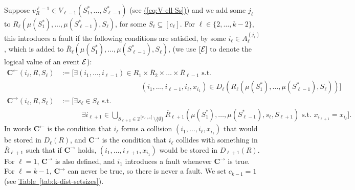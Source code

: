 \documentclass{theoretics}
\newcommand{\eq}[1]{\hyperref[eq:#1]{(\ref*{eq:#1})}}
\newcommand{\tabl}[1]{\hyperref[tab:#1]{Table~\ref*{tab:#1}}}
\renewcommand{\>}{\rangle}
\newcommand{\<}{\langle}
\renewcommand{\(}{\left(}
\renewcommand{\)}{\right)}
\begin{document}
Suppose $v_R^{\ell-1}\in V_{\ell-1}(S_1^*,\dots,S_{\ell-1}^*)$ (see \eq{V-ell-Ss}) and we add some $j_{\ell}$ to $R_{\ell}(\mu(S_1^*),\dots,\mu(S_{\ell-1}^*),S_{\ell})$, for some $S_{\ell}\subseteq [c_{\ell}]$. 
For $\ell\in\{2,\dots,k-2\}$, this introduces a fault if the following conditions are satisfied, by some $i_{\ell}\in A_{\ell}^{(j_{\ell})}$, which is added to $\overline{R}_{\ell}(\mu(S_1^*),\dots,\mu(S_{\ell-1}^*),S_{\ell})$, (we use $[{\cal E}]$ to denote the logical value of an event ${\cal E}$):
\begin{equation}
\begin{split}
\mathbf{C}^{\leftarrow}(i_{\ell},R,S_{\ell})&:= \big[\exists  (i_1,\dots,i_{\ell-1})\in R_1\times \overline{R}_2\times \dots \times \overline{R}_{\ell-1}\mbox{ s.t. }\\
& \qquad\qquad\qquad\qquad\qquad\quad\; (i_1,\dots,i_{\ell-1},i_{\ell},x_{i_1})\in D_{\ell}(R_{\ell}(\mu(S_1^*),\dots,\mu(S_{\ell-1}^*),S_{\ell}))\big]\\
\mathbf{C}^{\rightarrow}(i_{\ell},R,S_{\ell})&:= \Bigg[\exists s_{\ell}\in S_{\ell} \mbox{ s.t. }\\
&\qquad\quad\exists i_{\ell+1}\in \bigcup_{S_{\ell+1}\in 2^{[c_{\ell+1}]}\setminus\{\emptyset\}}\overline{R}_{\ell+1}(\mu(S_1^*),\dots,\mu(S_{\ell-1}^*),s_{\ell},S_{\ell+1}) \mbox{ s.t. }x_{i_{\ell+1}}=x_{i_{\ell}}\Bigg].
\end{split}\label{eq:k-dist-Carrows}
\end{equation}
In words $\mathbf{C}^{\leftarrow}$ is the condition that $i_{\ell}$ forms a collision $(i_1,\dots,i_{\ell},x_{i_1})$ that would be stored in $D_{\ell}(R)$, and $\mathbf{C}^{\rightarrow}$ is the condition that $i_{\ell}$ collides with something in $\overline{R}_{\ell+1}$ such that if $\mathbf{C}^{\rightarrow}$ holds, $(i_1,\dots,i_{\ell+1},x_{i_1})$ would be stored in $D_{\ell+1}(R)$. For $\ell=1$, $\mathbf{C}^{\rightarrow}$ is also defined, and $i_1$ introduces a fault whenever $\mathbf{C}^{\rightarrow}$ is true. For $\ell=k-1$, $\mathbf{C}^{\rightarrow}$ can never be true, so there is never a fault. We set $c_{k-1}=1$ (see \tabl{k-dist-setsizes}).
\end{document}

